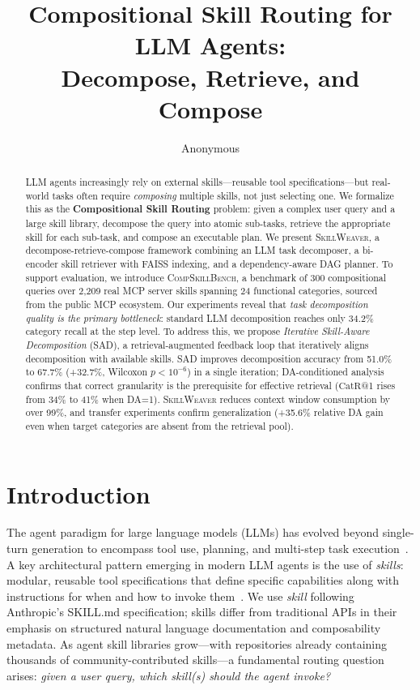 \documentclass[11pt]{article}
\title{Compositional Skill Routing for LLM Agents:\\Decompose, Retrieve, and Compose}
\author{Anonymous}
\newcommand{\system}{\textsc{SkillWeaver}}
\newcommand{\benchmark}{\textsc{CompSkillBench}}
\newcommand{\catrecall}{\text{CatR}}
\begin{document}
\maketitle

\begin{abstract}
LLM agents increasingly rely on external skills---reusable tool specifications---but real-world tasks often require \emph{composing} multiple skills, not just selecting one.
We formalize this as the \textbf{Compositional Skill Routing} problem: given a complex user query and a large skill library, decompose the query into atomic sub-tasks, retrieve the appropriate skill for each sub-task, and compose an executable plan.
We present \system{}, a decompose-retrieve-compose framework combining an LLM task decomposer, a bi-encoder skill retriever with FAISS indexing, and a dependency-aware DAG planner.
To support evaluation, we introduce \benchmark{}, a benchmark of 300 compositional queries over 2{,}209 real MCP server skills spanning 24 functional categories, sourced from the public MCP ecosystem.
Our experiments reveal that \emph{task decomposition quality is the primary bottleneck}: standard LLM decomposition reaches only 34.2\% category recall at the step level.
To address this, we propose \emph{Iterative Skill-Aware Decomposition} (SAD), a retrieval-augmented feedback loop that iteratively aligns decomposition with available skills.
SAD improves decomposition accuracy from 51.0\% to 67.7\% (+32.7\%, Wilcoxon $p < 10^{-6}$) in a single iteration; DA-conditioned analysis confirms that correct granularity is the prerequisite for effective retrieval ($\catrecall$@1 rises from 34\% to 41\% when DA=1).
\system{} reduces context window consumption by over 99\%, and transfer experiments confirm generalization (+35.6\% relative DA gain even when target categories are absent from the retrieval pool).
\end{abstract}

\section{Introduction}
\label{sec:intro}

The agent paradigm for large language models (LLMs) has evolved beyond single-turn generation to encompass tool use, planning, and multi-step task execution~\cite{schick2023toolformer,qin2023toolllm,patil2023gorilla}.
A key architectural pattern emerging in modern LLM agents is the use of \emph{skills}: modular, reusable tool specifications that define specific capabilities along with instructions for when and how to invoke them~\cite{anthropic2025skills}.
We use \emph{skill} following Anthropic's SKILL.md specification; skills differ from traditional APIs in their emphasis on structured natural language documentation and composability metadata.
As agent skill libraries grow---with repositories already containing thousands of community-contributed skills---a fundamental routing question arises: \emph{given a user query, which skill(s) should the agent invoke?}
\end{document}
